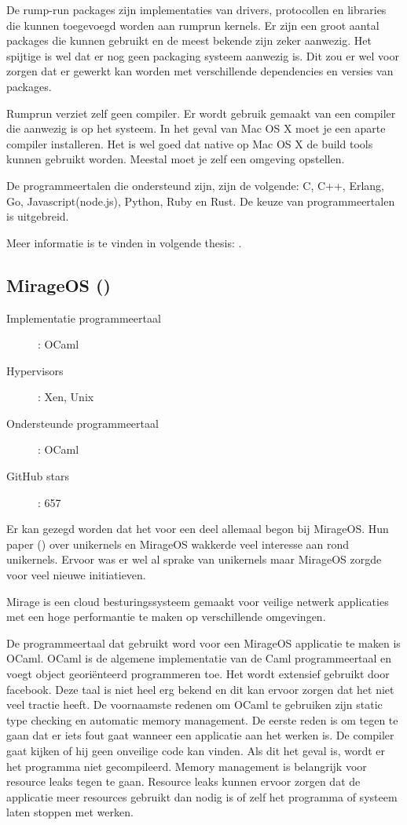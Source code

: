 \documentclass[pdftex,a4paper,12pt,twoside]{report}
\begin{document}
De rump-run packages zijn implementaties van drivers, protocollen en libraries die kunnen toegevoegd worden aan rumprun kernels. Er zijn een groot aantal packages die kunnen gebruikt en de meest bekende zijn zeker aanwezig.
Het spijtige is wel dat er nog geen packaging systeem aanwezig is. Dit zou er wel voor zorgen dat er gewerkt kan worden met verschillende dependencies en versies van packages.

Rumprun verziet zelf geen compiler. Er wordt gebruik gemaakt van een compiler die aanwezig is op het systeem. In het geval van Mac OS X moet je een aparte compiler installeren. Het is wel goed dat native op Mac OS X de build tools kunnen gebruikt worden. Meestal moet je zelf een omgeving opstellen.

De programmeertalen die ondersteund zijn, zijn de volgende: C, C++, Erlang, Go, Javascript(node.js), Python, Ruby en Rust. De keuze van programmeertalen is uitgebreid.

Meer informatie is te vinden in volgende thesis: \cite{kantee_flexible_2012}.

\subsection{MirageOS (\cite{mirage/mirage_0000})}

\begin{description}
  \item [Implementatie programmeertaal]: OCaml
  \item [Hypervisors]: Xen, Unix
  \item [Ondersteunde programmeertaal]: OCaml
  \item [GitHub stars]: 657
\end{description}

Er kan gezegd worden dat het voor een deel allemaal begon bij MirageOS. Hun paper (\cite{madhavapeddy_unikernels_2013}) over unikernels en MirageOS wakkerde veel interesse aan rond unikernels. Ervoor was er wel al sprake van unikernels maar MirageOS zorgde voor veel nieuwe initiatieven.

Mirage is een cloud besturingssysteem gemaakt voor veilige netwerk applicaties met een hoge performantie te maken op verschillende omgevingen.

De programmeertaal dat gebruikt word voor een MirageOS applicatie te maken is OCaml.
OCaml is de algemene implementatie van de Caml programmeertaal en voegt object georiënteerd programmeren toe. Het wordt extensief gebruikt door facebook. Deze taal is niet heel erg bekend en dit kan ervoor zorgen dat het niet veel tractie heeft.
De voornaamste redenen om OCaml te gebruiken zijn static type checking en automatic memory management. De eerste reden is om tegen te gaan dat er iets fout gaat wanneer een applicatie aan het werken is. De compiler gaat kijken of hij geen onveilige code kan vinden. Als dit het geval is, wordt er het programma niet gecompileerd.
Memory management is belangrijk voor resource leaks tegen te gaan. Resource leaks kunnen ervoor zorgen dat de applicatie meer resources gebruikt dan nodig is of zelf het programma of systeem laten stoppen met werken.
\end{document}
